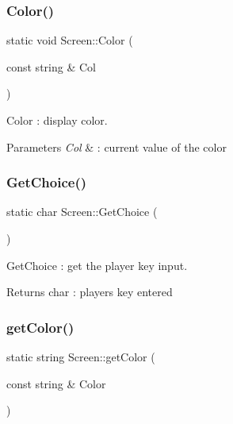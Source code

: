 \subsubsection{\texorpdfstring{Color()}{Color()}}
{\footnotesize\ttfamily static void Screen\+::\+Color (\begin{DoxyParamCaption}\item[{const string \&}]{Col }\end{DoxyParamCaption})\hspace{0.3cm}{\ttfamily [static]}}



Color \+: display color. 


\begin{DoxyParams}{Parameters}
{\em Col} & \+: current value of the color \\
\hline
\end{DoxyParams}
\mbox{\label{class_screen_adfa61a8f109d355e1b9cd8f4f07ecd02}} 
\subsubsection{\texorpdfstring{Get\+Choice()}{GetChoice()}}
{\footnotesize\ttfamily static char Screen\+::\+Get\+Choice (\begin{DoxyParamCaption}{ }\end{DoxyParamCaption})\hspace{0.3cm}{\ttfamily [static]}}



Get\+Choice \+: get the player key input. 

\begin{DoxyReturn}{Returns}
char \+: player\textquotesingle{}s key entered 
\end{DoxyReturn}
\mbox{\label{class_screen_a664156637aa90c77ee9e8719abb4e014}} 
\subsubsection{\texorpdfstring{get\+Color()}{getColor()}}
{\footnotesize\ttfamily static string Screen\+::get\+Color (\begin{DoxyParamCaption}\item[{const string \&}]{Color }\end{DoxyParamCaption})\hspace{0.3cm}{\ttfamily [static]}}



